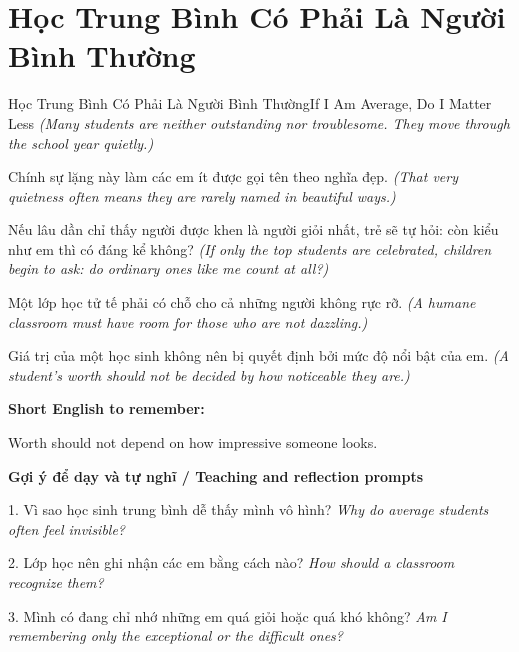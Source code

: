 \section{Học Trung Bình Có Phải Là Người Bình Thường}
\begin{truyen}{Học Trung Bình Có Phải Là Người Bình Thường}{If I Am Average, Do I Matter Less}
\textit{(Many students are neither outstanding nor troublesome. They move through the school year quietly.)}

Chính sự lặng này làm các em ít được gọi tên theo nghĩa đẹp.
\textit{(That very quietness often means they are rarely named in beautiful ways.)}

Nếu lâu dần chỉ thấy người được khen là người giỏi nhất, trẻ sẽ tự hỏi: còn kiểu như em thì có đáng kể không?
\textit{(If only the top students are celebrated, children begin to ask: do ordinary ones like me count at all?) }

Một lớp học tử tế phải có chỗ cho cả những người không rực rỡ.
\textit{(A humane classroom must have room for those who are not dazzling.)}

\end{truyen}

\begin{baihoc}
Giá trị của một học sinh không nên bị quyết định bởi mức độ nổi bật của em.
\textit{(A student's worth should not be decided by how noticeable they are.)}
\end{baihoc}

\begin{ghinhoanh}
\textbf{Short English to remember:}

Worth should not depend on how impressive someone looks.

\end{ghinhoanh}

\begin{tuhocnhanh}
\textbf{Gợi ý để dạy và tự nghĩ / Teaching and reflection prompts}

1. Vì sao học sinh trung bình dễ thấy mình vô hình? \textit{Why do average students often feel invisible?}

2. Lớp học nên ghi nhận các em bằng cách nào? \textit{How should a classroom recognize them?}

3. Mình có đang chỉ nhớ những em quá giỏi hoặc quá khó không? \textit{Am I remembering only the exceptional or the difficult ones?}
\end{tuhocnhanh}
\ngancach

